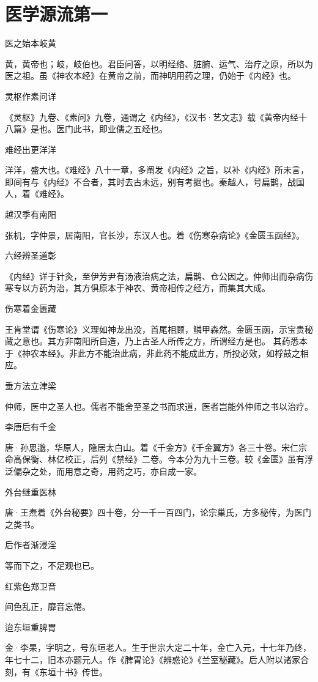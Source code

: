 \documentclass[a4paper,12pt,UTF8,twoside]{ctexbook}
\begin{document}
	\chapter{医学源流第一}
	医之始本岐黄
	
	黄，黄帝也；岐，岐伯也。君臣问答，以明经络、脏腑、运气、治疗之原，所以为医之祖。虽《神农本经》在黄帝之前，而神明用药之理，仍始于《内经》也。
	
	灵枢作素问详
	
	《灵枢》九卷、《素问》九卷，通谓之《内经》，《汉书·艺文志》载《黄帝内经十八篇》是也。医门此书，即业儒之五经也。
	
	难经出更洋洋
	
	洋洋，盛大也。《难经》八十一章，多阐发《内经》之旨，以补《内经》所未言，即间有与《内经》不合者，其时去古未远，别有考据也。秦越人，号扁鹊，战国人，着《难经》。
	
	越汉季有南阳
	
	张机，字仲景，居南阳，官长沙，东汉人也。着《伤寒杂病论》《金匮玉函经》。
	
	六经辨圣道彰
	
	《内经》详于针灸，至伊芳尹有汤液治病之法，扁鹊、仓公因之。仲师出而杂病伤寒专以方药为治，其方俱原本于神农、黄帝相传之经方，而集其大成。
	
	伤寒着金匮藏
	
	王肯堂谓《伤寒论》义理如神龙出没，首尾相顾，鳞甲森然。金匮玉函，示宝贵秘藏之意也。其方非南阳所自造，乃上古圣人所传之方，所谓经方是也。
	其药悉本于《神农本经》。非此方不能治此病，非此药不能成此方，所投必效，如桴鼓之相应。
	
	垂方法立津梁
	
	仲师，医中之圣人也。儒者不能舍至圣之书而求道，医者岂能外仲师之书以治疗。
	
	李唐后有千金
	
	唐·孙思邈，华原人，隐居太白山。着《千金方》《千金翼方》各三十卷。宋仁宗命高保衡、林亿校正，后列《禁经》二卷。今本分为九十三卷。较《金匮》虽有浮泛偏杂之处，而用意之奇，用药之巧，亦自成一家。
	
	外台继重医林
	
	唐·王焘着《外台秘要》四十卷，分一千一百四门，论宗巢氏，方多秘传，为医门之类书。
	
	后作者渐浸淫
	
	等而下之，不足观也已。
	
	红紫色郑卫音
	
	间色乱正，靡音忘倦。
	
	迨东垣重脾胃
	
	金·李杲，字明之，号东垣老人。生于世宗大定二十年，金亡入元，十七年乃终，年七十二，旧本亦题元人。作《脾胃论》《辨惑论》《兰室秘藏》。后人附以诸家合刻，有《东垣十书》传世。
	
\end{document}
